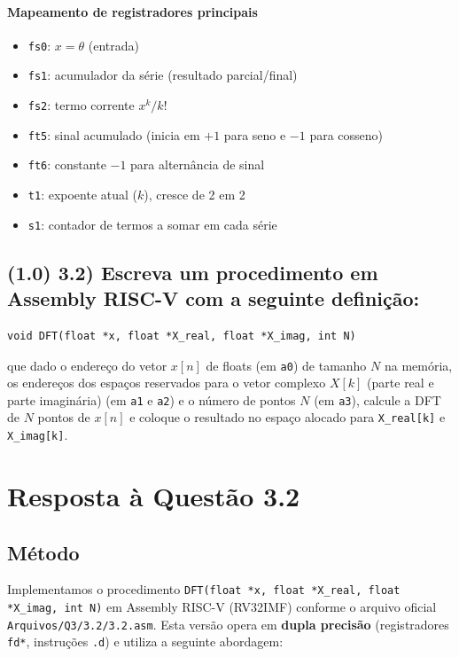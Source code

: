 \documentclass[12pt,a4paper]{article}
\begin{document}
\paragraph{Mapeamento de registradores principais}
\begin{itemize}
    \item \texttt{fs0}: \(x=\theta\) (entrada)
    \item \texttt{fs1}: acumulador da série (resultado parcial/final)
    \item \texttt{fs2}: termo corrente \(x^{k}/k!\)
    \item \texttt{ft5}: sinal acumulado (inicia em $+1$ para seno e $-1$ para cosseno)
    \item \texttt{ft6}: constante $-1$ para alternância de sinal
    \item \texttt{t1}: expoente atual (\(k\)), cresce de 2 em 2
    \item \texttt{s1}: contador de termos a somar em cada série
\end{itemize}

\subsection*{(1.0) 3.2) Escreva um procedimento em Assembly RISC-V com a seguinte definição:}

\begin{verbatim}
void DFT(float *x, float *X_real, float *X_imag, int N)
\end{verbatim}
que dado o endereço do vetor $x[n]$ de floats (em \texttt{a0}) de tamanho $N$ na memória, os endereços dos espaços reservados para o vetor complexo $X[k]$ (parte real e parte imaginária) (em \texttt{a1} e \texttt{a2}) e o número de pontos $N$ (em \texttt{a3}), calcule a DFT de $N$ pontos de $x[n]$ e coloque o resultado no espaço alocado para \texttt{X\_real[k]} e \texttt{X\_imag[k]}.

\section*{Resposta à Questão 3.2}

\subsection*{Método}
Implementamos o procedimento \texttt{DFT(float *x, float *X\_real, float *X\_imag, int N)} em Assembly RISC-V (RV32IMF) conforme o arquivo oficial \texttt{Arquivos/Q3/3.2/3.2.asm}. Esta versão opera em \textbf{dupla precisão} (registradores \texttt{fd*}, instruções \texttt{.d}) e utiliza a seguinte abordagem:
\end{document}
